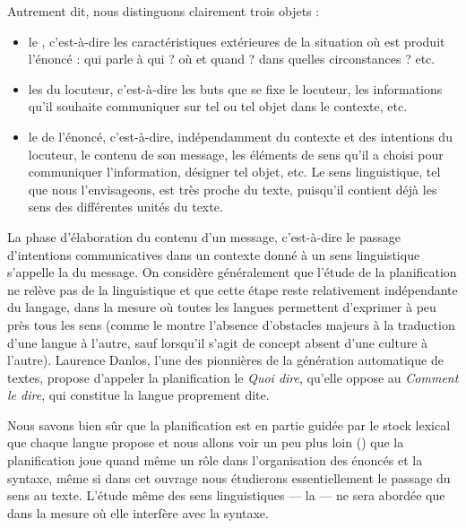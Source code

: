 Autrement dit, nous distinguons clairement trois objets :

\begin{itemize}
\item le , c’est-à-dire les caractéristiques extérieures de la situation où est produit l’énoncé : qui parle à qui ? où et quand ? dans quelles circonstances ? etc.
\item les  du locuteur, c’est-à-dire les buts que se fixe le locuteur, les informations qu’il souhaite communiquer sur tel ou tel objet dans le contexte, etc.
\item le  de l’énoncé, c’est-à-dire, indépendamment du contexte et des intentions du locuteur, le contenu de son message, les éléments de sens qu’il a choisi pour communiquer l’information, désigner tel objet, etc. Le sens linguistique, tel que nous l’envisageons, est très proche du texte, puisqu’il contient déjà les sens des différentes unités du texte.
\end{itemize}

La phase d’élaboration du contenu d’un message, c’est-à-dire le passage d’intentions communicatives dans un contexte donné à un sens linguistique s’appelle la  du message. On considère généralement que l’étude de la planification ne relève pas de la linguistique et que cette étape reste relativement indépendante du langage, dans la mesure où toutes les langues permettent d’exprimer à peu près tous les sens (comme le montre l’absence d’obstacles majeurs à la traduction d’une langue à l’autre, sauf lorsqu’il s’agit de concept absent d’une culture à l’autre). Laurence Danlos, l’une des pionnières de la génération automatique de textes, propose d’appeler la planification le \textit{Quoi dire}, qu’elle oppose au \textit{Comment le dire}, qui constitue la langue proprement dite.

Nous savons bien sûr que la planification est en partie guidée par le stock lexical que chaque langue propose et nous allons voir un peu plus loin () que la planification joue quand même un rôle dans l’organisation des énoncés et la syntaxe, même si dans cet ouvrage nous étudierons essentiellement le passage du sens au texte. L’étude même des sens linguistiques — la  — ne sera abordée que dans la mesure où elle interfère avec la syntaxe.

